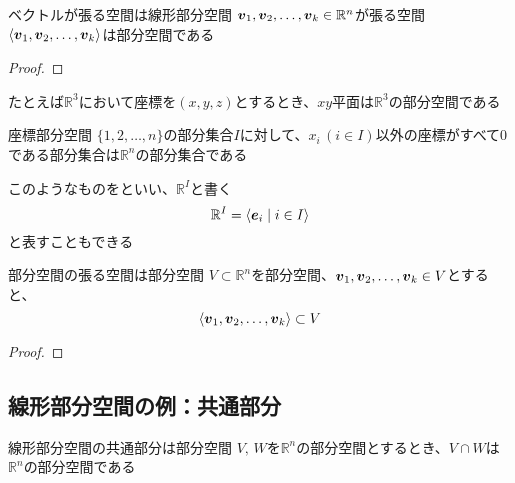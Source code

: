 \documentclass[../../../topic_linear-algebra]{subfiles}
\begin{document}
\begin{theorem}{ベクトルが張る空間は線形部分空間}
  $\vb*{v}_1, \vb*{v}_2, \dots, \vb*{v}_k \in \mathbb{R}^n$が張る空間$\langle \vb*{v}_1, \vb*{v}_2, \dots, \vb*{v}_k \rangle$は部分空間である
\end{theorem}

\begin{proof}
\end{proof}

\br

たとえば$\mathbb{R}^3$において座標を$(x, y, z)$とするとき、$xy$平面は$\mathbb{R}^3$の部分空間である

\begin{definition}{座標部分空間}
  $\{1, 2, \dots, n\}$の部分集合$I$に対して、$x_i \, (i \in I)$以外の座標がすべて0である部分集合は$\mathbb{R}^n$の部分集合である

  このようなものをといい、$\mathbb{R}^I$と書く
  \begin{equation*}
    \mathbb{R}^I = \langle \vb*{e}_i \mid i \in I \rangle
  \end{equation*}
  と表すこともできる
\end{definition}

\br

\begin{theorem}{部分空間の張る空間は部分空間}
  $V \subset \mathbb{R}^n$を部分空間、$\vb*{v}_1, \vb*{v}_2, \dots, \vb*{v}_k \in V$とすると、
  \begin{equation*}
    \langle \vb*{v}_1, \vb*{v}_2, \dots, \vb*{v}_k \rangle \subset V
  \end{equation*}
\end{theorem}

\begin{proof}
\end{proof}

\subsection{線形部分空間の例：共通部分}

\begin{theorem}{線形部分空間の共通部分は部分空間}
  $V,\,W$を$\mathbb{R}^n$の部分空間とするとき、$V \cap W$は$\mathbb{R}^n$の部分空間である
\end{theorem}
\end{document}
